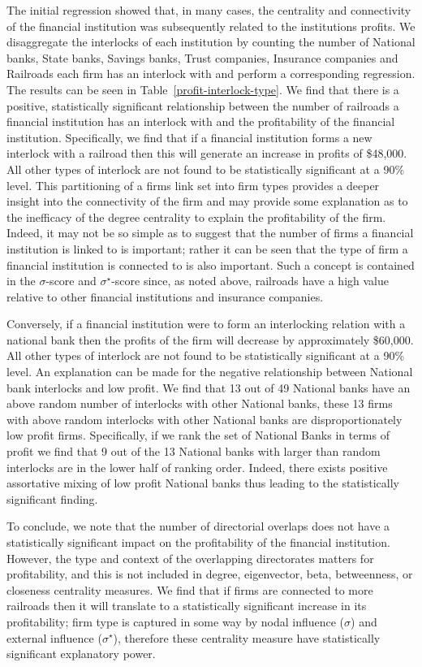 The initial regression showed that, in many cases, the centrality and connectivity of the financial institution was subsequently related to the institutions profits. We disaggregate the interlocks of each institution by counting the number of National banks, State banks, Savings banks, Trust companies, Insurance companies and Railroads each firm has an interlock with and perform a corresponding regression. The results can be seen in Table~\ref{profit-interlock-type}. We find that there is a positive, statistically significant relationship between the number of railroads a financial institution has an interlock with and the profitability of the financial institution. Specifically, we find that if a financial institution forms a new interlock with a railroad then this will generate an increase in profits of \$48,000. All other types of interlock are not found to be statistically significant at a 90\% level. This partitioning of a firms link set into firm types provides a deeper insight into the connectivity of the firm and may provide some explanation as to the inefficacy of the degree centrality to explain the profitability of the firm. Indeed, it may not be so simple as to suggest that the number of firms a financial institution is linked to is important; rather it can be seen that the type of firm a financial institution is connected to is also important. Such a concept is contained in the $\sigma$-score and $\sigma^{\star}$-score since, as noted above, railroads have a high value relative to other financial institutions and insurance companies.

Conversely, if a financial institution were to form an interlocking relation with a national bank then the profits of the firm will decrease by approximately \$60,000. All other types of interlock are not found to be statistically significant at a 90\% level. An explanation can be made for the negative relationship between National bank interlocks and low profit. We find that 13 out of 49 National banks have an above random number of interlocks with other National banks, these 13 firms with above random interlocks with other National banks are disproportionately low profit firms. Specifically, if we rank the set of National Banks in terms of profit we find that 9 out of the 13 National banks with larger than random interlocks are in the lower half of ranking order. Indeed, there exists positive assortative mixing of low profit National banks thus leading to the statistically significant finding.

To conclude, we note that the number of directorial overlaps does not have a statistically significant impact on the profitability of the financial institution. However, the type and context of the overlapping directorates matters for profitability, and this is not included in degree, eigenvector, beta, betweenness, or closeness centrality measures. We find that if firms are connected to more railroads then it will translate to a statistically significant increase in its profitability; firm type is captured in some way by nodal influence ($\sigma$) and external influence ($\sigma^{\star}$), therefore these centrality measure have statistically significant explanatory power.

